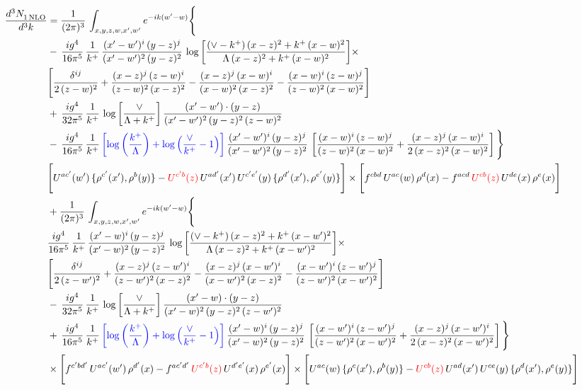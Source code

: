 \documentclass[9pt]{article}
\numberwithin{equation}{section}
\begin{document}
\begin{align}
 \frac{d^{3}N_{1\,\rm NLO}^{\rm}}{d^{3}k}  & =    \frac{1}{(2\pi)^{3}}\,\int_{x,y,z,w,x',w^{\prime}} e^{-ik(w^{\prime}-w)}\Bigg\{ \notag \\ & -\, \frac{ig^{4}}{16\pi^{5}}\,\frac{1}{k^{+}}\, \frac{(x'-w')^{i}\,(y-z)^{j}}{(x'-w')^{2}\,(y-z)^{2}}\,\log{\left[\frac{(\vee-k^{+})\,(x-z)^{2}+k^{+}\,(x-w)^{2}}{\Lambda\, (x-z)^{2}+k^{+}\,(x-w)^{2}}\right]}\times\notag \\ &  \Bigg[\frac{\delta^{ij}}{2\,(z-w)^{2}}+\frac{(x-z)^{j}\,(z-w)^{i}}{(z-w)^{2}\,(x-z)^{2}}-\frac{(x-z)^{j}\,(x-w)^{i}}{(x-w)^{2}\,(x-z)^{2}}-\frac{(x-w)^{i}\,(z-w)^{j}}{(z-w)^{2}\,(x-w)^{2}}\Bigg]\notag \\ & +\,\frac{ig^{4}}{32\pi^{5}}\,\frac{1}{k^{+}}\,\log{\left[\frac{\vee}{\Lambda + k^{+}}\right]}\, \frac{(x'-w')\cdot (y-z)}{(x'-w')^{2}\,(y-z)^{2}\,(z-w)^{2}}\notag \\ & -\, \frac{ig^{4}}{16\pi^{5}}\,\frac{1}{k^{+}}\,{\color{blue}\left[\log{\left(\frac{k^{+}}{\Lambda}\right)}+\log{\left(\frac{\vee}{k^{+}}-1\right)}\right]}\,\frac{(x'-w')^{i}\,(y-z)^{j}}{(x'-w')^{2}\,(y-z)^{2}}\,\left[\frac{(x-w)^{i}\,(z-w)^{j}}{(z-w)^{2}\,(x-w)^{2}}+\frac{(x-z)^{j}\,(x-w)^{i}}{2\,(x-z)^{2}\, (x-w)^{2}}\right]\Bigg\} \notag \\ & \Bigg[U^{ac'}(w')\,\{\rho^{c'}(x'),\rho^{b}(y)\}-{\color{red}U^{c'b}(z)}\,U^{ad'}(x')\,U^{c'e'}(y)\, \{\rho^{d'}(x'),\rho^{e'}(y)\}\Bigg]\times \Bigg[f^{cbd}\,U^{ac}(w)\,\rho^{d}(x)-f^{acd}\, {\color{red}U^{cb}(z)}\,U^{de}(x)\,\rho^{e}(x)\Bigg]\notag \\ & + \frac{1}{(2\pi)^{3}}\,\int_{x,y,z,w,x',w^{\prime}} e^{-ik(w^{\prime}-w)}\Bigg\{ \notag \\ &  \frac{ig^{4}}{16\pi^{5}}\,\frac{1}{k^{+}}\, \frac{(x'-w)^{i}\,(y-z)^{j}}{(x'-w)^{2}\,(y-z)^{2}}\,\log{\left[\frac{(\vee-k^{+})\,(x-z)^{2}+k^{+}\,(x-w')^{2}}{\Lambda\, (x-z)^{2} + k^{+}\,(x-w')^{2}}\right]}\times\notag \\ &  \Bigg[\frac{\delta^{ij}}{2\,(z-w')^{2}}+\frac{(x-z)^{j}\,(z-w')^{i}}{(z-w')^{2}\,(x-z)^{2}}-\frac{(x-z)^{j}\,(x-w')^{i}}{(x-w')^{2}\,(x-z)^{2}}-\frac{(x-w')^{i}\,(z-w')^{j}}{(z-w')^{2}\,(x-w')^{2}}\Bigg]\notag \\ & -\,\frac{ig^{4}}{32\pi^{5}}\,\frac{1}{k^{+}}\,\log{\left[\frac{\vee}{\Lambda + k^{+}}\right]}\, \frac{(x'-w)\cdot (y-z)}{(x'-w)^{2}\,(y-z)^{2}\,(z-w')^{2}}\notag \\ & +\,\frac{ig^{4}}{16\pi^{5}}\,\frac{1}{k^{+}}\,{\color{blue}\left[\log{\left(\frac{k^{+}}{\Lambda}\right)}+\log{\left(\frac{\vee}{k^{+}}-1\right)}\right]}\,\frac{(x'-w)^{i}\,(y-z)^{j}}{(x'-w)^{2}\,(y-z)^{2}}\,\left[\frac{(x-w')^{i}\,(z-w')^{j}}{(z-w')^{2}\,(x-w')^{2}}+\frac{(x-z)^{j}\,(x-w')^{i}}{2\,(x-z)^{2}\, (x-w')^{2}}\right] \Bigg\} \notag \\ & \times\Bigg[f^{c'bd'}\,U^{ac'}(w')\,\rho^{d'}(x)-f^{ac'd'}\, {\color{red}U^{c'b}(z)}\,U^{d'e'}(x)\,\rho^{e'}(x)\Bigg] \times \Bigg[U^{ac}(w)\,\{\rho^{c}(x'),\rho^{b}(y)\}-{\color{red}U^{cb}(z)}\,U^{ad}(x')\,U^{ce}(y)\, \{\rho^{d}(x'),\rho^{e}(y)\}\Bigg]
\end{align}
\end{document}
